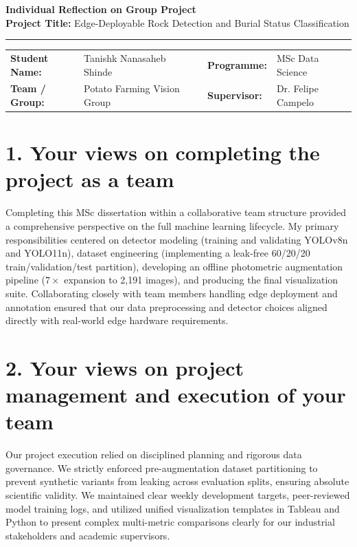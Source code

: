 \documentclass[11pt, a4paper]{article}
\begin{document}
\begin{center}
    {\Large \bfseries Individual Reflection on Group Project} \\[0.3em]
    {\small \textbf{Project Title:} Edge-Deployable Rock Detection and Burial Status Classification} \\[0.2em]
    \rule{\textwidth}{1pt}
\end{center}

\vspace{-0.5em}
\noindent
\begin{tabular}{@{}ll p{2cm} ll@{}}
    \textbf{Student Name:} & Tanishk Nanasaheb Shinde & & \textbf{Programme:} & MSc Data Science \\
    \textbf{Team / Group:} & Potato Farming Vision Group & & \textbf{Supervisor:} & Dr. Felipe Campelo \\
\end{tabular}

\vspace{0.2em}

\section*{1. Your views on completing the project as a team}
Completing this MSc dissertation within a collaborative team structure provided a comprehensive perspective on the full machine learning lifecycle. My primary responsibilities centered on detector modeling (training and validating YOLOv8n and YOLO11n), dataset engineering (implementing a leak-free 60/20/20 train/validation/test partition), developing an offline photometric augmentation pipeline ($7\times$ expansion to 2,191 images), and producing the final visualization suite. Collaborating closely with team members handling edge deployment and annotation ensured that our data preprocessing and detector choices aligned directly with real-world edge hardware requirements.

\section*{2. Your views on project management and execution of your team}
Our project execution relied on disciplined planning and rigorous data governance. We strictly enforced pre-augmentation dataset partitioning to prevent synthetic variants from leaking across evaluation splits, ensuring absolute scientific validity. We maintained clear weekly development targets, peer-reviewed model training logs, and utilized unified visualization templates in Tableau and Python to present complex multi-metric comparisons clearly for our industrial stakeholders and academic supervisors.
\end{document}
